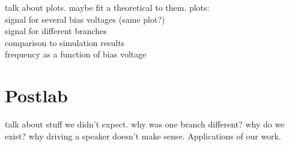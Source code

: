 \documentclass{article}
\begin{document}
talk about plots. maybe fit a theoretical to them.
plots:\\
signal for several bias voltages (same plot?)\\
signal for different branches\\
comparison to simulation results\\
frequency as a function of bias voltage\

\section{Postlab}
talk about stuff we didn't expect. why was one branch different? why do we exist? why driving a speaker doesn't make sense. Applications of our work.

\end{document}
